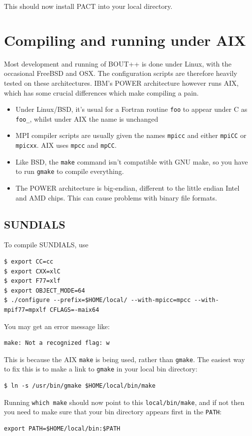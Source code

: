 \documentclass[12pt]{article}
\newcommand{\code}[1]{\texttt{#1}}
\begin{document}
This should now install PACT into your local directory.

\section{Compiling and running under AIX}

Most development and running of BOUT++ is done under Linux, with the occasional FreeBSD and OSX.
The configuration scripts are therefore heavily tested on these architectures. IBM's POWER
architecture however runs AIX, which has some crucial differences which make compiling a pain.

\begin{itemize}
\item Under Linux/BSD, it's usual for a Fortran routine \code{foo} to appear
  under C as \code{foo\_}, whilst under AIX the name is unchanged
\item MPI compiler scripts are usually given the names \code{mpicc} and
  either \code{mpiCC} or \code{mpicxx}. AIX uses \code{mpcc} and \code{mpCC}.
\item Like BSD, the \code{make} command isn't compatible with GNU make,
  so you have to run \code{gmake} to compile everything.
\item The POWER architecture is big-endian, different to the little endian 
  Intel and AMD chips. This can cause problems with binary file formats.
\end{itemize}

\subsection{SUNDIALS}

To compile SUNDIALS, use 
\begin{verbatim}
$ export CC=cc
$ export CXX=xlC
$ export F77=xlf
$ export OBJECT_MODE=64
$ ./configure --prefix=$HOME/local/ --with-mpicc=mpcc --with-mpif77=mpxlf CFLAGS=-maix64
\end{verbatim}

You may get an error message like:
\begin{verbatim}
make: Not a recognized flag: w
\end{verbatim}
This is because the AIX \code{make} is being used, rather than \code{gmake}.
The easiest way to fix this is to make a link to \code{gmake} in your local
bin directory:
\begin{verbatim}
$ ln -s /usr/bin/gmake $HOME/local/bin/make
\end{verbatim}
Running \code{which make} should now point to this \code{local/bin/make},
and if not then you need to make sure that your bin directory appears first
in the \code{PATH}:
\begin{verbatim}
export PATH=$HOME/local/bin:$PATH
\end{verbatim}
\end{document}
